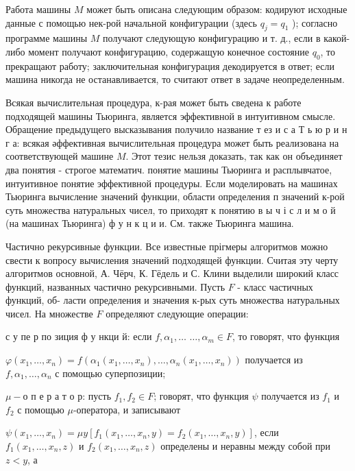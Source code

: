 \documentclass[10pt]{article}
\begin{document}
Работа машины $M$ может быть описана следующим образом: кодируют исходные данные с помощью нек-рой начальной конфигурации (здесь $q_{j}=q_{1}$ ); согласно программе машины $M$ получают следующую конфигурацию и т. д., если в какой-либо момент получают конфигурацию, содержащую конечное состояние $q_{0}$, то прекращают работу; заключительная конфигурация декодируется в ответ; если машина никогда не останавливается, то считают ответ в задаче неопределенным.



Всякая вычислительная процедура, к-рая может быть сведена к работе подходящей машины Тьюринга, является эффективной в интуитивном смысле. Обращение предыдущего высказывания получило название т ез и с а Т ь ю р и н г а: всякая әффективная вычислительная процедура может быть реализована на соответствующей машине $M$. Этот тезис нельзя доказать, так как он объединяет два понятия - строгое математич. понятие машины Тьюринга и расплывчатое, интуитивное понятие эффективной процедуры. Если моделировать на машинах Тьюринга вычисление значений функции, области определения п значений к-рой суть множества натуральных чисел, то приходят к понятию в ы ч і с л и м о й (на машинах Тьюринга) ф у н к ц и и. См. также Тьюринга машина.



Частично рекурсивные функции. Все известные прігмеры алгоритмов можно свести к вопросу вычисления значений подходящей функции. Считая эту черту алгоритмов основной, А. Чёрч, К. Гёдель и С. Клини выделили широкий класс функций, названных частично рекурсивными. Пусть $F$ - класс частичных функций, об- ласти определения и значения к-рых суть множества натуральных чисел. На множестве $F$ определяют следующие операции:



с у пе р по зиция ф у нкци й: если $f, \alpha_{1}, \ldots$ $\ldots, \alpha_{m} \in F$, то говорят, что функция



$\varphi\left(x_{1}, \ldots, x_{n}\right)=f\left(\alpha_{1}\left(x_{1}, \ldots, x_{n}\right), \ldots, \alpha_{n}\left(x_{1}, \ldots, x_{n}\right)\right)$ получается из $f, \alpha_{1}, \ldots, \alpha_{n}$ с помощью суперпозиции;



$\mu-о$ п е р а т о р: пусть $f_{1}, f_{2} \in F$; говорят, что функция $\psi$ получается из $f_{1}$ и $f_{2}$ с помощью $\mu$-оператора, и записывают



$\psi\left(x_{1}, \ldots, x_{n}\right)=\mu y\left[f_{1}\left(x_{1}, \ldots, x_{n}, y\right)=f_{2}\left(x_{1}, \ldots, x_{n}, y\right)\right]$, если $f_{1}\left(x_{1}, \ldots, x_{n}, z\right)$ и $f_{2}\left(x_{1}, \ldots, x_{n}, z\right)$ определены и неравны между собой при $z<y$, а
\end{document}

